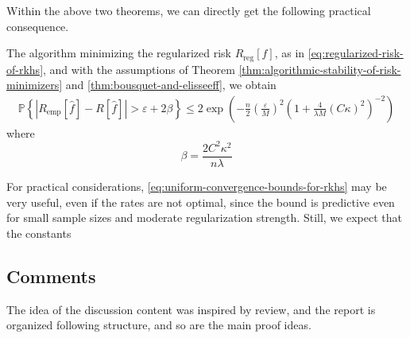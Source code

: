 Within the above two theorems, we can directly get the following practical consequence.
\begin{corollary}
	The algorithm minimizing the regularized risk $R_{\text{reg}}[f]$, as in \eqref{eq:regularized-risk-of-rkhs}, and with the assumptions of Theorem \ref{thm:algorithmic-stability-of-risk-minimizers} and \ref{thm:bousquet-and-elisseeff}, we obtain
	\begin{eqnarray}
		\label{eq:uniform-convergence-bounds-for-rkhs}
		\mathbb{P}\left\{\left|R_{\text{emp}}[\hat{f}]-R[\hat{f}]\right|>\varepsilon+2\beta\right\}\leq 2\exp\left(-\frac{n}{2}\left(\frac{\varepsilon}{M}\right)^{2}\left(1+\frac{4}{\lambda M}(C \kappa)^{2}\right)^{-2}\right)
	\end{eqnarray}
	where
	\begin{equation*}
		\beta=\frac{2C^{2}\kappa^{2}}{n\lambda}
	\end{equation*}
\end{corollary}

\begin{remark}
	For practical considerations, \eqref{eq:uniform-convergence-bounds-for-rkhs} may be very useful, even if the rates are not optimal, since the bound is predictive even for small sample sizes and moderate regularization strength. Still, we expect that the constants
\end{remark}

\subsection*{Comments}

The idea of the discussion content was inspired by \cite[Section 3]{hofmann_kernel_2008} review, and the report is organized following \cite[Chapter 12]{scholkopf_learning_2001} structure, and so are the main proof ideas.
